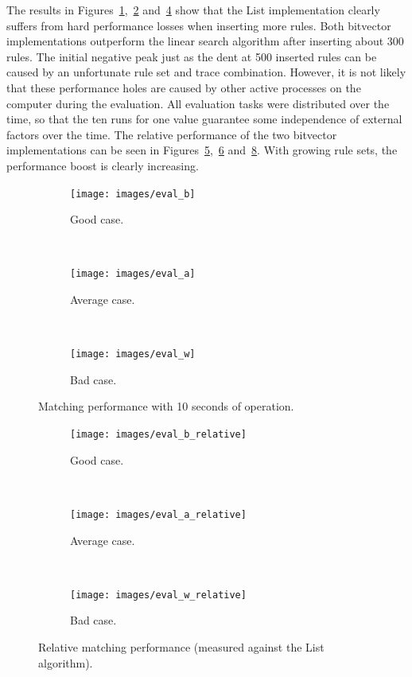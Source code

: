 \documentclass[a4paper,
		12pt,
		parskip=full,
		titlepage
		]{scrartcl}
\begin{document}
The results in Figures~\ref{fig:eval_good_case},~\ref{fig:eval_average_case} and~\ref{fig:eval_bad_case} show that the List implementation
clearly suffers from hard performance losses when inserting more rules.
Both bitvector implementations outperform the linear search algorithm after inserting about 300 rules.
The initial negative peak just as the dent at 500 inserted rules can be caused by an unfortunate rule set and trace combination.
However, it is not likely that these performance holes are caused by other active processes on the computer during the evaluation.
All evaluation tasks were distributed over the time, so that the ten runs 
for one value guarantee some independence of external factors over the time.
The relative performance of the two bitvector implementations can be seen in
Figures~\ref{fig:eval_good_case_relative},~\ref{fig:eval_average_case_relative} and~\ref{fig:eval_bad_case_relative}.
With growing rule sets, the performance boost is clearly increasing.

\begin{figure}
    \centering
    \begin{subfigure}{.45\linewidth}
        \centering
        \texttt{[image: images/eval\_b]}
        \caption{Good case.}
        \label{fig:eval_good_case}
    \end{subfigure}
    ~
    \begin{subfigure}{.45\linewidth}
        \centering
        \texttt{[image: images/eval\_a]}
        \caption{Average case.}
        \label{fig:eval_average_case}
    \end{subfigure}
    ~
    \begin{subfigure}{.45\linewidth}
        \centering
        \texttt{[image: images/eval\_w]}
        \caption{Bad case.}
        \label{fig:eval_bad_case}
    \end{subfigure}
    \caption{Matching performance with 10 seconds of operation.}
\end{figure}

\begin{figure}
    \centering
    \begin{subfigure}{.45\linewidth}
        \centering
        \texttt{[image: images/eval\_b\_relative]}
        \caption{Good case.}
        \label{fig:eval_good_case_relative}
    \end{subfigure}
    ~
    \begin{subfigure}{.45\linewidth}
        \centering
        \texttt{[image: images/eval\_a\_relative]}
        \caption{Average case.}
        \label{fig:eval_average_case_relative}
    \end{subfigure}
    ~
    \begin{subfigure}{.45\linewidth}
        \centering
        \texttt{[image: images/eval\_w\_relative]}
        \caption{Bad case.}
        \label{fig:eval_bad_case_relative}
    \end{subfigure}
    \caption{Relative matching performance (measured against the List algorithm).}
\end{figure}
\end{document}
